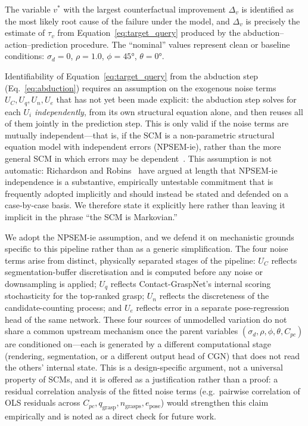 \documentclass[11pt,a4paper]{report}
\begin{document}
The variable $v^*$ with the largest counterfactual improvement $\Delta_v$ is identified as the most likely root cause of the failure under the model, and $\Delta_v$ is precisely the estimate of $\tau_v$ from Equation~\eqref{eq:target_query} produced by the abduction--action--prediction procedure. The ``nominal'' values represent clean or baseline conditions: $\sigma_d = 0$, $\rho = 1.0$, $\phi = 45°$, $\theta = 0°$.

Identifiability of Equation~\eqref{eq:target_query} from the abduction step (Eq.~\ref{eq:abduction}) requires an assumption on the exogenous noise terms $U_C, U_q, U_n, U_e$ that has not yet been made explicit: the abduction step solves for each $U_i$ \emph{independently}, from its own structural equation alone, and then reuses all of them jointly in the prediction step. This is only valid if the noise terms are mutually independent---that is, if the SCM is a non-parametric structural equation model with independent errors (NPSEM-ie), rather than the more general SCM in which errors may be dependent~\cite{vonk2023disentangling}. This assumption is not automatic: Richardson and Robins~\cite{richardsonrobins2013} have argued at length that NPSEM-ie independence is a substantive, empirically untestable commitment that is frequently adopted implicitly and should instead be stated and defended on a case-by-case basis. We therefore state it explicitly here rather than leaving it implicit in the phrase ``the SCM is Markovian.''

We adopt the NPSEM-ie assumption, and we defend it on mechanistic grounds specific to this pipeline rather than as a generic simplification. The four noise terms arise from distinct, physically separated stages of the pipeline: $U_C$ reflects segmentation-buffer discretisation and is computed before any noise or downsampling is applied; $U_q$ reflects Contact-GraspNet's internal scoring stochasticity for the top-ranked grasp; $U_n$ reflects the discreteness of the candidate-counting process; and $U_e$ reflects error in a separate pose-regression head of the same network. These four sources of unmodelled variation do not share a common upstream mechanism once the parent variables $(\sigma_d, \rho, \phi, \theta, C_{pc})$ are conditioned on---each is generated by a different computational stage (rendering, segmentation, or a different output head of CGN) that does not read the others' internal state. This is a design-specific argument, not a universal property of SCMs, and it is offered as a justification rather than a proof: a residual correlation analysis of the fitted noise terms (e.g.\ pairwise correlation of OLS residuals across $C_{pc}, q_{\text{grasp}}, n_{\text{grasps}}, e_{\text{pose}}$) would strengthen this claim empirically and is noted as a direct check for future work.
\end{document}
